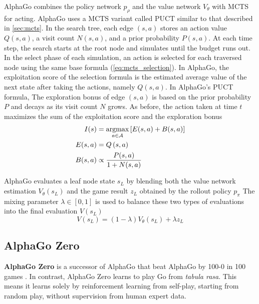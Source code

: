 AlphaGo combines the policy network $p_{\rho}$ and the value network $V_{\theta}$ with MCTS for acting.
AlphaGo uses a MCTS variant called PUCT similar to that described in \ref{sec:mcts}.
In the search tree, each edge $(s, a)$ stores an action value $Q(s, a)$, a visit count $N(s, a)$, and a prior probability $P(s, a)$.
At each time step, the search starts at the root node and simulates until the budget runs out.
In the select phase of each simulation, an action is selected for each traversed node using the same base formula (\ref{eq:mcts_selection}).
In AlphaGo, the exploitation score of the selection formula is the estimated average value of the next state after taking the actions, namely $Q(s, a)$.
In AlphaGo's PUCT formula, The exploration bonus of edge $(s, a)$ is based on the prior probability $P$ and decays as its visit count $N$ grows.
As before, the action taken at time $t$ maximizes the sum of the exploitation score and the exploration bonus
\begin{align*}
    I(s)     & = \operatorname*{argmax}_{a \in \mathcal{A}}\left[ E(s, a)+B(s, a) \right]  \\
    E(s, a)  & = Q\left(s, a\right)  \\
    B(s, a)  & \propto \frac{P(s, a)}{1 + N(s, a)}  \\
\end{align*}

AlphaGo evaluates a leaf node state $s_L$ by blending both the value network estimation $V_\theta(s_L)$ and the game result $z_L$ obtained by the rollout policy $p_\pi$
The mixing parameter $\lambda \in [0, 1]$ is used to balance these two types of evaluations into the final evaluation $V(s_L)$
$$
    V\left(s_{L}\right)=(1-\lambda) V_{\theta}\left(s_{L}\right)+\lambda z_{L}
$$

\subsection{AlphaGo Zero}
\textbf{AlphaGo Zero} is a successor of AlphaGo that beat AlphaGo by 100-0 in 100 games \cite{MasteringGameGo_Silver.Schrittwieser.ea_2017}.
In contrast, AlphaGo Zero learns to play Go from \textit{tabula rasa}.
This means it learns solely by reinforcement learning from self-play, starting from random play, without supervision from human expert data.

